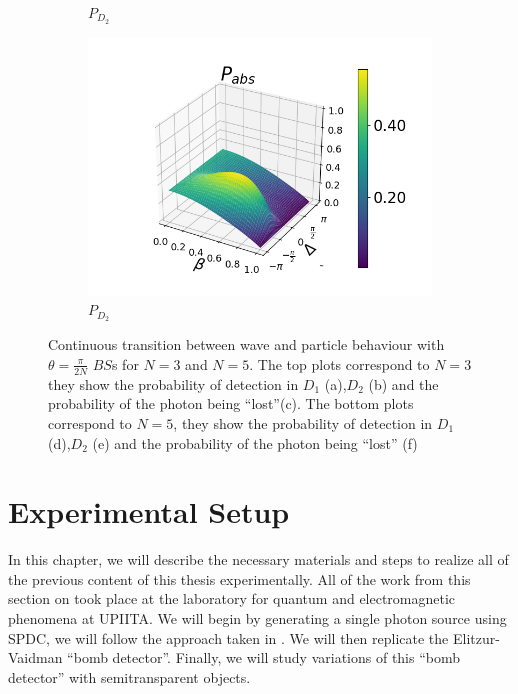 \documentclass[12pt]{book}
\begin{document}
\begin{figure}[H]
\begin{subfigure}[b]{0.45\linewidth}
\caption{$P_{D_{2}}$ }
\label{fig:BS1}
\end{subfigure}
\begin{subfigure}[b]{0.45\linewidth}
\includegraphics[width=\linewidth]{images/pabs_5.png}
\caption{$P_{D_{2}}$ }
\label{fig:BS1}
\end{subfigure}
\caption{Continuous transition between wave and particle behaviour with $\theta=\frac{\pi}{2N}$ $BS$s for $N=3$ and $N=5$. The top plots correspond to $N=3$ they show the probability of detection in $D_{1}$ (a),$D_{2}$ (b) and the probability of the photon being ``lost''(c). The bottom plots correspond to $N=5$, they show the probability of detection in $D_{1}$ (d),$D_{2}$ (e) and the probability of the photon being ``lost'' (f)}
\label{figvarias2}
\end{figure}



\chapter{Experimental Setup}
In this chapter, we will describe the necessary materials and steps to realize all of the previous content of this thesis experimentally. All of the work from this section on took place at the laboratory for quantum and electromagnetic phenomena at UPIITA. We will begin by generating a single photon source using SPDC, we will follow the approach taken in \cite{maestria_procopio}. We will then replicate the Elitzur-Vaidman ``bomb detector''. Finally, we will study variations of this ``bomb detector'' with semitransparent objects.
\end{document}
